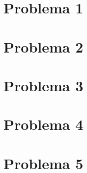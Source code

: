\section{Problema 1}
\section{Problema 2}
\section{Problema 3}
\section{Problema 4}
\section{Problema 5}
 














